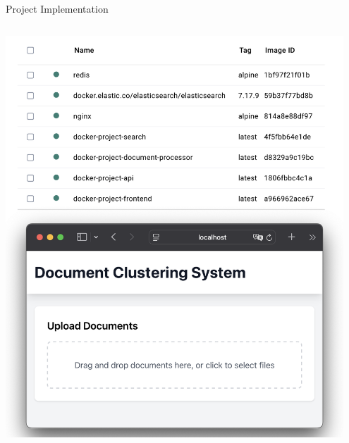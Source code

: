\documentclass[notes]{beamer}
\begin{document}
\begin{frame}[fragile]{Project Implementation}
\begin{columns}[T]
        \begin{column}{0.5\textwidth}
            \centering  %
            \vspace{0.5cm}  %
            \includegraphics[width=0.95\textwidth,height=0.7\textheight,keepaspectratio]{screenshot.png}
        \end{column}
    \end{columns}
\end{frame}
\end{document}
